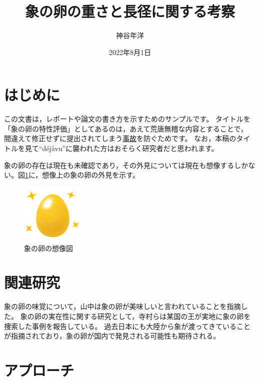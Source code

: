 \documentclass[dvipdfmx]{jsarticle}
\begin{document}
\title{象の卵の重さと長径に関する考察}
\author{神谷年洋}
\date{2022年8月1日}
\maketitle

\section{はじめに}

この文書は，レポートや論文の書き方を示すためのサンプルです。
タイトルを「象の卵の特性評価」としてあるのは，あえて荒唐無稽な内容とすることで，
間違えて修正せずに提出されてしまう\href{https://twitter.com/taku_ymnk/status/392959147974471681?s=20&t=3p7I92WEGvoPpj_7d-dtyA}{事故}を防ぐためです。 %
なお，本稿のタイトルを見て``d\'{e}j\`{a}vu''に襲われた方はおそらく研究者だと思われます。 %

象の卵の存在は現在も未確認であり，その外見については現在も想像するしかない。図\ref{fig:golden_egg}に，想像上の象の卵の外見を示す。 %

\begin{figure}[htp]
\centering
\includegraphics[width=3cm]{golden_egg.png}
\caption{象の卵の想像図}
\label{fig:golden_egg}
\end{figure}

\section{関連研究}
\label{sec:related} %

象の卵の味覚について，山中\cite{kakenhi_latex}は象の卵が美味しいと言われていることを指摘した。 %
象の卵の実在性に関する研究として，寺村ら\cite{teramura2009}は某国の王が実地に象の卵を捜索した事例を報告している。
過去日本にも大陸から象が渡ってきていることが指摘\cite{kamei1990}されており，象の卵が国内で発見される可能性も期待される。

\section{アプローチ}
\end{document}
